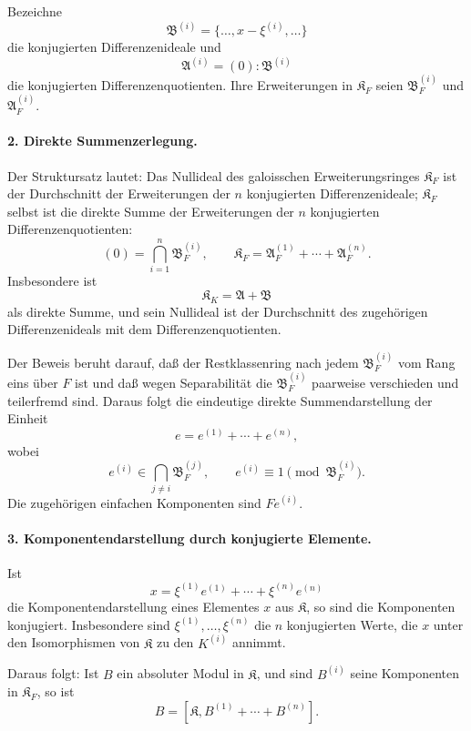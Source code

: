 \documentclass[11pt]{article}
\begin{document}
Bezeichne
\[
        \mathfrak B^{(i)}=\{\ldots,x-\xi^{(i)},\ldots\}
\]
die konjugierten Differenzenideale und
\[
        \mathfrak A^{(i)}=(0):\mathfrak B^{(i)}
\]
die konjugierten Differenzenquotienten. Ihre Erweiterungen in $\mathfrak K_F$ seien $\mathfrak B_F^{(i)}$ und $\mathfrak A_F^{(i)}$.

\paragraph{2. Direkte Summenzerlegung.}
Der Struktursatz lautet: Das Nullideal des galoisschen Erweiterungsringes $\mathfrak K_F$ ist der Durchschnitt der Erweiterungen der $n$ konjugierten Differenzenideale; $\mathfrak K_F$ selbst ist die direkte Summe der Erweiterungen der $n$ konjugierten Differenzenquotienten:
\[
        (0)=\bigcap_{i=1}^n \mathfrak B_F^{(i)},
        \qquad
        \mathfrak K_F=\mathfrak A_F^{(1)}+\cdots+\mathfrak A_F^{(n)}.
\]
Insbesondere ist
\[
        \mathfrak K_K=\mathfrak A+\mathfrak B
\]
als direkte Summe, und sein Nullideal ist der Durchschnitt des zugehörigen Differenzenideals mit dem Differenzenquotienten.

Der Beweis beruht darauf, daß der Restklassenring nach jedem $\mathfrak B_F^{(i)}$ vom Rang eins über $F$ ist und daß wegen Separabilität die $\mathfrak B_F^{(i)}$ paarweise verschieden und teilerfremd sind. Daraus folgt die eindeutige direkte Summendarstellung der Einheit
\[
        e=e^{(1)}+\cdots+e^{(n)},
\]
wobei
\[
        e^{(i)}\in \bigcap_{j\ne i}\mathfrak B_F^{(j)},
        \qquad
        e^{(i)}\equiv 1\pmod{\mathfrak B_F^{(i)}}.
\]
Die zugehörigen einfachen Komponenten sind $Fe^{(i)}$.

\paragraph{3. Komponentendarstellung durch konjugierte Elemente.}
Ist
\[
        x=\xi^{(1)}e^{(1)}+\cdots+\xi^{(n)}e^{(n)}
\]
die Komponentendarstellung eines Elementes $x$ aus $\mathfrak K$, so sind die Komponenten konjugiert. Insbesondere sind $\xi^{(1)},\ldots,\xi^{(n)}$ die $n$ konjugierten Werte, die $x$ unter den Isomorphismen von $\mathfrak K$ zu den $K^{(i)}$ annimmt.

Daraus folgt: Ist $B$ ein absoluter Modul in $\mathfrak K$, und sind $B^{(i)}$ seine Komponenten in $\mathfrak K_F$, so ist
\[
        B=[\mathfrak K,B^{(1)}+\cdots+B^{(n)}].
\]
\end{document}
